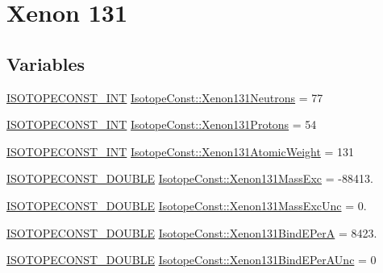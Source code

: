 \hypertarget{group___isotope_const-_xenon-_xe131}{}\section{Xenon 131}
\label{group___isotope_const-_xenon-_xe131}
\subsection*{Variables}
\begin{DoxyCompactItemize}
\item 
\mbox{\hyperlink{group___isotope_const-_macros_ga5f18360b3e99483a35c32d789e62621c}{I\+S\+O\+T\+O\+P\+E\+C\+O\+N\+S\+T\+\_\+\+I\+NT}} \mbox{\hyperlink{group___isotope_const-_xenon-_xe131_ga78ff951824d556ac46b4020f49fbe52f}{Isotope\+Const\+::\+Xenon131\+Neutrons}} = 77
\item 
\mbox{\hyperlink{group___isotope_const-_macros_ga5f18360b3e99483a35c32d789e62621c}{I\+S\+O\+T\+O\+P\+E\+C\+O\+N\+S\+T\+\_\+\+I\+NT}} \mbox{\hyperlink{group___isotope_const-_xenon-_xe131_gadc6a9bbe6d479290b808cc0475899ef7}{Isotope\+Const\+::\+Xenon131\+Protons}} = 54
\item 
\mbox{\hyperlink{group___isotope_const-_macros_ga5f18360b3e99483a35c32d789e62621c}{I\+S\+O\+T\+O\+P\+E\+C\+O\+N\+S\+T\+\_\+\+I\+NT}} \mbox{\hyperlink{group___isotope_const-_xenon-_xe131_ga7c87b081a0873344229a7f282918abc2}{Isotope\+Const\+::\+Xenon131\+Atomic\+Weight}} = 131
\item 
\mbox{\hyperlink{group___isotope_const-_macros_ga8f45a7272ce02c0b4c65c44636ed719a}{I\+S\+O\+T\+O\+P\+E\+C\+O\+N\+S\+T\+\_\+\+D\+O\+U\+B\+LE}} \mbox{\hyperlink{group___isotope_const-_xenon-_xe131_gaf0962fe7cd9bf8ae673c7ad707e0a6be}{Isotope\+Const\+::\+Xenon131\+Mass\+Exc}} = -\/88413.
\item 
\mbox{\hyperlink{group___isotope_const-_macros_ga8f45a7272ce02c0b4c65c44636ed719a}{I\+S\+O\+T\+O\+P\+E\+C\+O\+N\+S\+T\+\_\+\+D\+O\+U\+B\+LE}} \mbox{\hyperlink{group___isotope_const-_xenon-_xe131_gaf992897dfd43c40af7bd6f1a9f004b29}{Isotope\+Const\+::\+Xenon131\+Mass\+Exc\+Unc}} = 0.
\item 
\mbox{\hyperlink{group___isotope_const-_macros_ga8f45a7272ce02c0b4c65c44636ed719a}{I\+S\+O\+T\+O\+P\+E\+C\+O\+N\+S\+T\+\_\+\+D\+O\+U\+B\+LE}} \mbox{\hyperlink{group___isotope_const-_xenon-_xe131_ga94a73aaee63664cb78c257fc0ee620ef}{Isotope\+Const\+::\+Xenon131\+Bind\+E\+PerA}} = 8423.
\item 
\mbox{\hyperlink{group___isotope_const-_macros_ga8f45a7272ce02c0b4c65c44636ed719a}{I\+S\+O\+T\+O\+P\+E\+C\+O\+N\+S\+T\+\_\+\+D\+O\+U\+B\+LE}} \mbox{\hyperlink{group___isotope_const-_xenon-_xe131_ga142d69211b15e6e0a54c03d240b399cf}{Isotope\+Const\+::\+Xenon131\+Bind\+E\+Per\+A\+Unc}} = 0

\end{DoxyCompactItemize}
